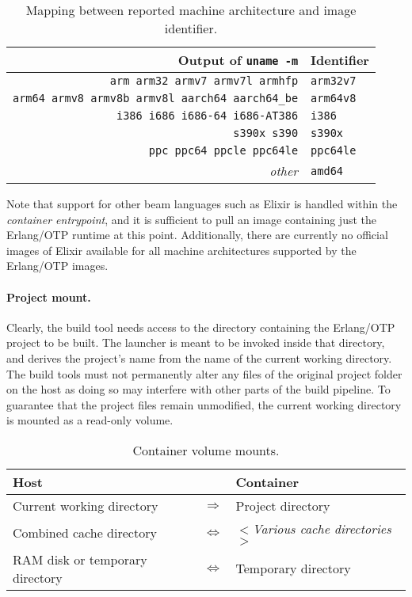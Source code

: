 \begin{table}
  \setlength{\tabcolsep}{10pt}
  \centering
  \begin{tabular}{ r l }
    Output of \lstinline|uname -m| & Identifier \\
    \hline
    \lstinline|arm arm32 armv7 armv7l armhfp| & \lstinline|arm32v7| \\
    \lstinline|arm64 armv8 armv8b armv8l aarch64 aarch64_be| & \lstinline|arm64v8| \\
    \lstinline|i386 i686 i686-64 i686-AT386| & \lstinline|i386| \\
    \lstinline|s390x s390| & \lstinline|s390x| \\
    \lstinline|ppc ppc64 ppcle ppc64le| & \lstinline|ppc64le| \\
    \emph{other} & \lstinline|amd64| \\
  \end{tabular}
  \caption{Mapping between reported machine architecture and image identifier.}\label{table:architectures}
\end{table}

Note that support for other \acrshort{beam} languages such as Elixir is handled within the \emph{container entrypoint}, and it is sufficient to pull an image containing just the Erlang/OTP runtime at this point. Additionally, there are currently no official images of Elixir available for all machine architectures supported by the Erlang/OTP images.


\paragraph{Project mount.} Clearly, the build tool needs access to the directory containing the Erlang/OTP project to be built. The launcher is meant to be invoked inside that directory, and derives the project's name from the name of the current working directory. The build tools must not permanently alter any files of the original project folder on the host as doing so may interfere with other parts of the build pipeline. To guarantee that the project files remain unmodified, the current working directory is mounted as a read-only volume.

\begin{table}[h]
  \setlength{\tabcolsep}{10pt}
  \centering
  \begin{tabular}{ l c l }
    Host & & Container \\
    \hline
    Current working directory &
      $\Longrightarrow$ &
      Project directory \\
    Combined cache directory &
      $\Longleftrightarrow$ &
      $<$\emph{Various cache directories}$>$ \\
    RAM disk or temporary directory &
      $\Longleftrightarrow$ &
      Temporary directory \\
  \end{tabular}
  \caption{Container volume mounts.}
\end{table}

